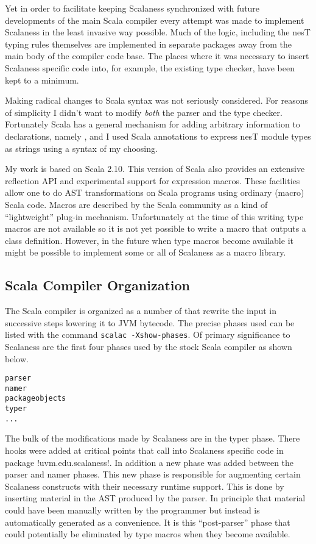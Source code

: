 Yet in order to facilitate keeping Scalaness synchronized with future developments of the main
Scala compiler every attempt was made to implement Scalaness in the least invasive way possible.
Much of the logic, including the nesT typing rules themselves are implemented in separate
packages away from the main body of the compiler code base. The places where it was necessary to
insert Scalaness specific code into, for example, the existing type checker, have been kept to a
minimum.

Making radical changes to Scala syntax was not seriously considered. For reasons of simplicity I
didn't want to modify \emph{both} the parser and the type checker. Fortunately Scala has a
general mechanism for adding arbitrary information to declarations, namely
, and I used Scala annotations to express nesT module types as strings
using a syntax of my choosing.

My work is based on Scala 2.10. This version of Scala also provides an extensive reflection API
and experimental support for expression macros. These facilities allow one to do AST
transformations on Scala programs using ordinary (macro) Scala code. Macros are described by the
Scala community as a kind of ``lightweight'' plug-in mechanism. Unfortunately at the time of
this writing type macros are not available so it is not yet possible to write a macro that
outputs a class definition. However, in the future when type macros become available it might be
possible to implement some or all of Scalaness as a macro library.

\subsection{Scala Compiler Organization}
\label{section-scala-compiler-organization}

The Scala compiler is organized as a number of  that rewrite the input in
successive steps lowering it to JVM bytecode. The precise phases used can be listed with the
command \texttt{scalac -Xshow-phases}. Of primary significance to Scalaness are the first four
phases used by the stock Scala compiler as shown below.

\singlespace
\begin{Verbatim}
parser
namer
packageobjects
typer
...
\end{Verbatim}
\primaryspacing

The bulk of the modifications made by Scalaness are in the typer phase. There hooks were added
at critical points that call into Scalaness specific code in package !uvm.edu.scalaness!. In
addition a new phase was added between the parser and namer phases. This new phase is
responsible for augmenting certain Scalaness constructs with their necessary runtime support.
This is done by inserting material in the AST produced by the parser. In principle that material
could have been manually written by the programmer but instead is automatically generated as a
convenience. It is this ``post-parser'' phase that could potentially be eliminated by type
macros when they become available.

